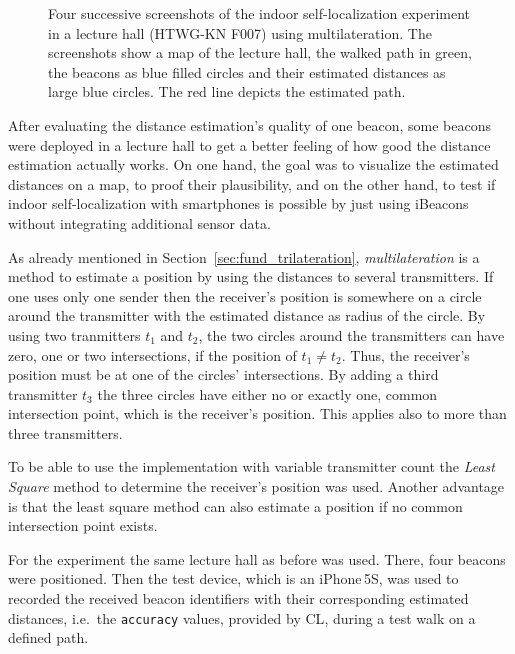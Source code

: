 \begin{figure}
  
  \caption{Four successive screenshots of the indoor self-localization experiment in a lecture hall (HTWG-KN F007) using multilateration. The screenshots show a map of the lecture hall, the walked path in green, the beacons as blue filled circles and their estimated distances as large blue circles. The red line depicts the estimated path.}
  \label{fig:beacon_eval_multilat}
\end{figure}

After evaluating the distance estimation's quality of one beacon, some beacons were deployed in a lecture hall to get a better feeling of how good the distance estimation actually works. On one hand, the goal was to visualize the estimated distances on a map, to proof their plausibility, and on the other hand, to test if indoor self-localization with smartphones is possible by just using iBeacons without integrating additional sensor data.

As already mentioned in Section~\ref{sec:fund_trilateration}, \emph{multilateration} is a method to estimate a position by using the distances to several transmitters. If one uses only one sender then the receiver's position is somewhere on a circle around the transmitter with the estimated distance as radius of the circle.
By using two tranmitters $t_1$ and $t_2$, the two circles around the transmitters can have zero, one or two intersections, if the position of $t_1 \neq t_2$. Thus, the receiver's position must be at one of the circles' intersections.
By adding a third transmitter $t_3$ the three circles have either no or exactly one, common intersection point, which is the receiver's position. This applies also to more than three transmitters.

To be able to use the implementation with variable transmitter count the \emph{Least Square} method to determine the receiver's position was used. Another advantage is that the least square method can also estimate a position if no common intersection point exists.

For the experiment the same lecture hall as before was used. There, four beacons were positioned. Then the test device, which is an iPhone\,5S, was used to recorded the received beacon identifiers with their corresponding estimated distances, i.e.\ the \texttt{accuracy} values, provided by \acs{CL}, during a test walk on a defined path.


